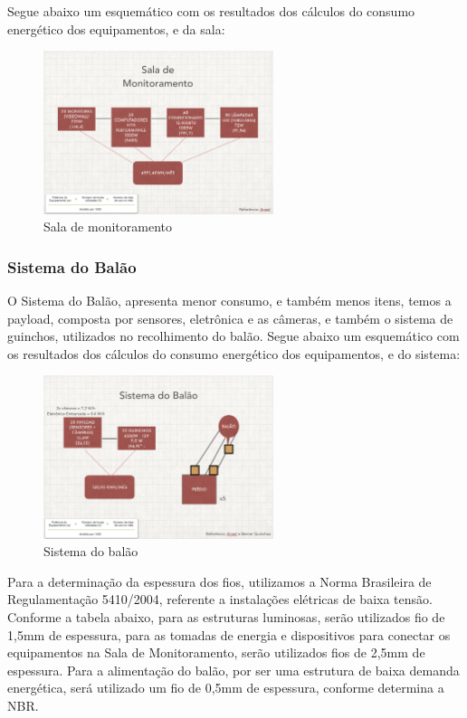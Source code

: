 Segue abaixo um esquemático com os resultados dos cálculos do consumo energético dos equipamentos, e da sala:

\begin{figure}[H]
	\centering
	\includegraphics[width=0.6\textwidth]{figuras/salaMonitoramento}
	\caption{Sala de monitoramento}
	\label{img:salaMonitoramento}
\end{figure}


\subsubsection{Sistema do Balão}

O Sistema do Balão, apresenta menor consumo, e também menos itens, temos a payload, composta por sensores, eletrônica e as câmeras, e também o sistema de guinchos, utilizados no recolhimento do balão.
Segue abaixo um esquemático com os resultados dos cálculos do consumo energético dos equipamentos, e do sistema:

\begin{figure}[H]
	\centering
	\includegraphics[width=0.6\textwidth]{figuras/sistemaBalao}
	\caption{Sistema do balão}
	\label{img:sistemaBalao}
\end{figure}


Para a determinação da espessura dos fios, utilizamos a Norma Brasileira de Regulamentação 5410/2004, referente a instalações elétricas de baixa tensão. Conforme a tabela abaixo, para as estruturas luminosas, serão utilizados fio de 1,5mm de espessura, para as tomadas de energia e dispositivos para conectar os equipamentos na Sala de Monitoramento, serão utilizados fios de 2,5mm de espessura. Para a alimentação do balão, por ser uma estrutura de baixa demanda energética, será utilizado um fio de 0,5mm de espessura, conforme determina a NBR.

